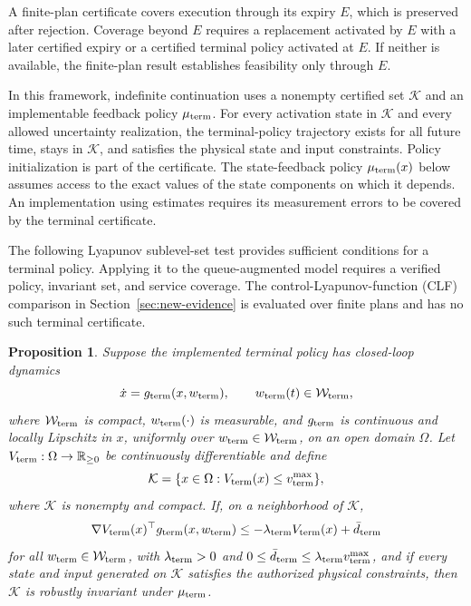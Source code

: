 \documentclass[preprint,12pt]{elsarticle}
\theoremstyle{definition}
\theoremstyle{plain}
\newtheorem{proposition}{Proposition}
\theoremstyle{definition}
\theoremstyle{plain}
\begin{document}
A finite-plan certificate covers execution through its expiry $E$, which
is preserved after rejection. Coverage beyond $E$ requires a replacement
activated by $E$ with a later certified expiry or a certified terminal policy activated at $E$. If neither is available, the finite-plan result
establishes feasibility only through $E$.

In this framework, indefinite continuation uses a nonempty certified set
$\mathcal K$ and an implementable feedback policy $\mu_{\rm term}$. For every
activation state in $\mathcal K$ and every allowed uncertainty realization,
the terminal-policy trajectory exists for all future time, stays in $\mathcal K$,
and satisfies the physical state and input constraints. Policy
initialization is part of the certificate. The state-feedback policy
$\mu_{\rm term}(x)$ below assumes access to the exact values of the state components
on which it depends. An implementation using estimates requires its
measurement errors to be covered by the terminal certificate.

The following Lyapunov sublevel-set test \cite{khalil2002nonlinear}
provides sufficient conditions for a terminal policy. Applying it to the
queue-augmented model requires a verified policy, invariant set, and
service coverage. The control-Lyapunov-function (CLF) comparison in
Section~\ref{sec:new-evidence} is evaluated over finite plans and has
no such terminal certificate.

\begin{proposition}
\label{prop:backup-lyapunov}
Suppose the implemented terminal policy has closed-loop dynamics
\[
\dot x=g_{\rm term}(x,w_{\rm term}),\qquad w_{\rm term}(t)\in\mathcal W_{\rm term},
\]
where $\mathcal W_{\rm term}$ is compact, $w_{\rm term}(\cdot)$ is measurable, and $g_{\rm term}$ is
continuous and locally Lipschitz in $x$, uniformly over
$w_{\rm term}\in\mathcal W_{\rm term}$, on an open domain $\Omega$. Let
$V_{\rm term}:\Omega\rightarrow\mathbb R_{\ge0}$ be continuously differentiable and define
\[
\mathcal K=\{x\in\Omega:V_{\rm term}(x)\le v_{\rm term}^{\max}\},
\]
where $\mathcal K$ is nonempty and compact. If, on a neighborhood of
$\mathcal K$,
\[
\nabla V_{\rm term}(x)^\top g_{\rm term}(x,w_{\rm term})
\le -\lambda_{\rm term} V_{\rm term}(x)+\bar d_{\rm term}
\]
for all $w_{\rm term}\in\mathcal W_{\rm term}$, with
$\lambda_{\rm term}>0$ and
$0\le\bar d_{\rm term}\le\lambda_{\rm term} v_{\rm term}^{\max}$, and if every state and input generated
on $\mathcal K$ satisfies the authorized physical constraints, then
$\mathcal K$ is robustly invariant under $\mu_{\rm term}$.
\end{proposition}
\end{document}
